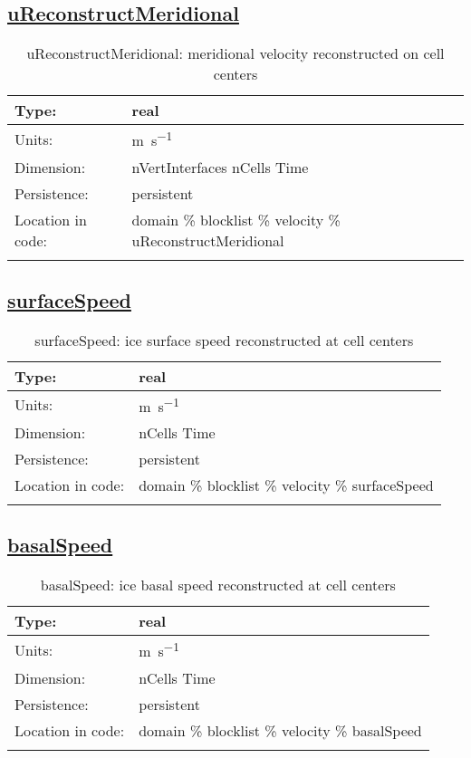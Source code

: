 \subsection[uReconstructMeridional]{\hyperref[sec:var_tab_velocity]{uReconstructMeridional}}
\label{subsec:var_sec_velocity_uReconstructMeridional}
\begin{center}
\begin{longtable}{| p{2.0in} | p{4.0in} |}
        \hline 
        Type: & real \\
        \hline 
        Units: & \si{m.s^{-1}} \\
        \hline 
        Dimension: & nVertInterfaces nCells Time \\
        \hline 
        Persistence: & persistent \\
        \hline 
         Location in code: & domain \% blocklist \% velocity \% uReconstructMeridional \\
         \hline 
    \caption{uReconstructMeridional: meridional velocity reconstructed on cell centers}
\end{longtable}
\end{center}
\subsection[surfaceSpeed]{\hyperref[sec:var_tab_velocity]{surfaceSpeed}}
\label{subsec:var_sec_velocity_surfaceSpeed}
\begin{center}
\begin{longtable}{| p{2.0in} | p{4.0in} |}
        \hline 
        Type: & real \\
        \hline 
        Units: & \si{m.s^{-1}} \\
        \hline 
        Dimension: & nCells Time \\
        \hline 
        Persistence: & persistent \\
        \hline 
         Location in code: & domain \% blocklist \% velocity \% surfaceSpeed \\
         \hline 
    \caption{surfaceSpeed: ice surface speed reconstructed at cell centers}
\end{longtable}
\end{center}
\subsection[basalSpeed]{\hyperref[sec:var_tab_velocity]{basalSpeed}}
\label{subsec:var_sec_velocity_basalSpeed}
\begin{center}
\begin{longtable}{| p{2.0in} | p{4.0in} |}
        \hline 
        Type: & real \\
        \hline 
        Units: & \si{m.s^{-1}} \\
        \hline 
        Dimension: & nCells Time \\
        \hline 
        Persistence: & persistent \\
        \hline 
         Location in code: & domain \% blocklist \% velocity \% basalSpeed \\
         \hline 
    \caption{basalSpeed: ice basal speed reconstructed at cell centers}
\end{longtable}
\end{center}
